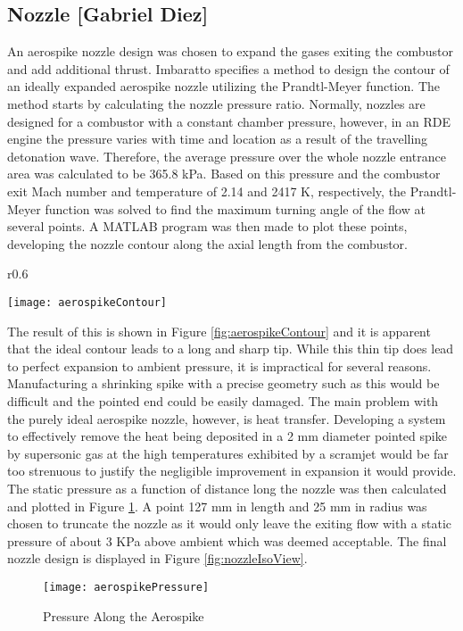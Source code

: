 \subsection{Nozzle [Gabriel Diez]}

An aerospike nozzle design was chosen to expand the gases exiting the combustor and add additional thrust. Imbaratto \cite{imbaratto} specifies a method to design the contour of an ideally expanded aerospike nozzle utilizing the Prandtl-Meyer function. The method starts by calculating the nozzle pressure ratio. Normally, nozzles are designed for a combustor with a constant chamber pressure, however, in an RDE engine the pressure varies with time and location as a result of the travelling detonation wave. Therefore, the average pressure over the whole nozzle entrance area was calculated to be 365.8 kPa. Based on this pressure and the combustor exit Mach number and temperature of 2.14 and 2417 K, respectively, the Prandtl-Meyer function was solved to find the maximum turning angle of the flow at several points. A MATLAB program was then made to plot these points, developing the nozzle contour along the axial length from the combustor.

\begin{wrapfigure}{r}{0.6\textwidth}
\begin{center}
\texttt{[image: aerospikeContour]}
\caption{Aerospike Contour}
\label{fig:aerospikeContour}
\end{center}
\end{wrapfigure}
 
The result of this is shown in Figure \ref{fig:aerospikeContour} and it is apparent that the ideal contour leads to a long and sharp tip. While this thin tip does lead to perfect expansion to ambient pressure, it is impractical for several reasons. Manufacturing a shrinking spike with a precise geometry such as this would be difficult and the pointed end could be easily damaged. The main problem with the purely ideal aerospike nozzle, however, is heat transfer. Developing a system to effectively remove the heat being deposited in a 2 mm diameter pointed spike by supersonic gas at the high temperatures exhibited by a scramjet would be far too strenuous to justify the negligible improvement in expansion it would provide. The static pressure as a function of distance long the nozzle was then calculated and plotted in Figure \ref{fig:aerospikePressure}. A point 127 mm in length and 25 mm in radius was chosen to truncate the nozzle as it would only leave the exiting flow with a static pressure of about 3 KPa above ambient which was deemed acceptable. The final nozzle design is displayed in Figure \ref{fig:nozzleIsoView}.

\begin{figure}[H]
\begin{center}
\texttt{[image: aerospikePressure]}
\caption{Pressure Along the Aerospike}
\label{fig:aerospikePressure}
\end{center}
\end{figure}


